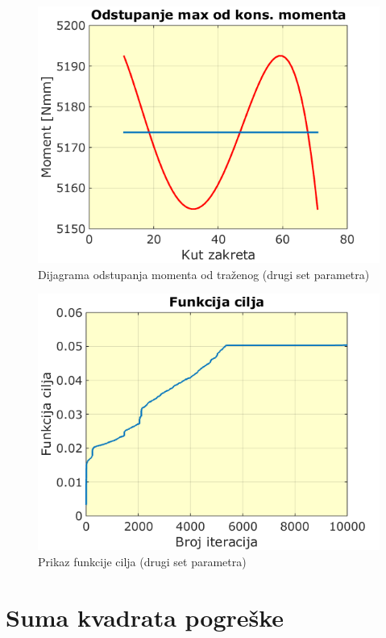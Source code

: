 \begin{figure}[h!]
\center
\includegraphics[scale=.6]{slike/max_m2.png}
\caption{Dijagrama odstupanja momenta od traženog (drugi set parametra)}
\label{fig:max_m2}
\end{figure}

\begin{figure}[h!]
\center
\includegraphics[scale=.6]{slike/max_f2.png}
\caption{Prikaz funkcije cilja (drugi set parametra)}
\label{fig:max_f2}
\end{figure}



\section{Suma kvadrata pogreške}

